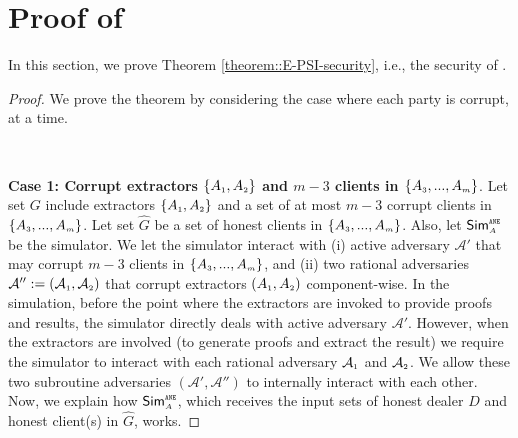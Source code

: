 

\section{Proof of \epsi}\label{sec::E-PSI-proof}



In this section, we prove Theorem \ref{theorem::E-PSI-security}, i.e., the security of \epsi. 


\begin{proof}
%
We prove the theorem by considering the case where each party is corrupt, at a time.

\



\noindent\textbf{Case 1: Corrupt extractors $\{A_{\scriptscriptstyle 1}, A_{\scriptscriptstyle 2}\}$ and $m-3$ clients in $\{  {  A}_{ \scriptscriptstyle {   3}}, ...,   {  A}_{ \scriptscriptstyle {   m}}\}$}.  Let set $G$ include extractors $\{A_{\scriptscriptstyle 1}, A_{\scriptscriptstyle 2}\}$ and a set of at most $m-3$ corrupt clients in $\{  {  A}_{ \scriptscriptstyle {   3}}, ...,   {  A}_{ \scriptscriptstyle {   m}}\}$. Let set $\hat G$ be a set of honest clients in  $\{  {  A}_{ \scriptscriptstyle {   3}}, ...,   {  A}_{ \scriptscriptstyle {   m}}\}$. Also, let $\mathsf{Sim}^{\scriptscriptstyle\mathtt{ANE}}_{\scriptscriptstyle A}$ be the simulator. We let the simulator  interact with (i) active adversary  $\mathcal{A}'$ that may corrupt $m-3$ clients in $\{  {  A}_{ \scriptscriptstyle {   3}}, ...,   {  A}_{ \scriptscriptstyle {   m}}\}$, and (ii) two rational adversaries  $\mathcal{A}'':=(\mathcal{A}_{\scriptscriptstyle 1}, \mathcal{A}_{\scriptscriptstyle 2})$ that corrupt extractors $(A_{\scriptscriptstyle 1},A_{\scriptscriptstyle 2})$ component-wise.  
%
%
In the simulation, before the point where the extractors are invoked to provide proofs and results, the simulator directly deals with active adversary  $\mathcal{A}'$. However, when the extractors are involved (to generate proofs and extract the result) we require the simulator to interact with each rational adversary $\mathcal{A}_{\scriptscriptstyle 1}$ and $\mathcal{A}_{\scriptscriptstyle 2}$.  We allow these two subroutine adversaries $(\mathcal{A}', \mathcal{A}'')$  to internally interact with each other.  Now, we explain how $\mathsf{Sim}^{\scriptscriptstyle \mathtt{ANE}}_{\scriptscriptstyle A}$, which receives the input sets of honest dealer $D$ and honest client(s) in $\hat G$,  works. 




\end{proof}
